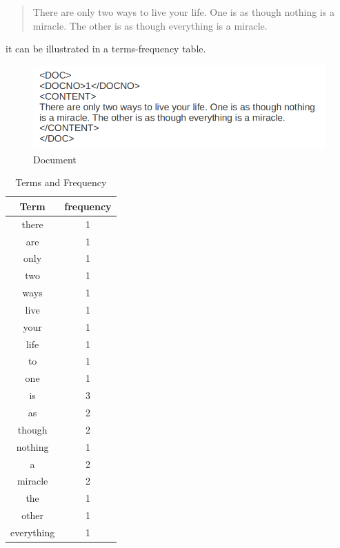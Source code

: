 \begin{quotation}
 \item There are only two ways to live your life. One is as though nothing is a miracle. The other is as though everything is a miracle.
\end{quotation}

it can be illustrated in a terms-frequency table.
\begin{figure}
\centering
\includegraphics[scale=0.5]{./figures/text.png}
\caption{Document} \label{fig:quote} 
\end{figure}

% 
\begin{table}
\centering
\begin{tabular}{|c|c|}

\hline \textbf{Term} & \textbf{frequency} \\
\hline there & 1 \\
\hline are & 1 \\
\hline only & 1 \\ 
\hline two & 1 \\
\hline ways & 1 \\
\hline live & 1 \\
\hline your & 1 \\
\hline life & 1 \\
\hline to & 1 \\
\hline one & 1 \\
\hline is & 3 \\
\hline as & 2 \\
\hline though & 2 \\
\hline nothing & 1 \\
\hline a & 2 \\
\hline miracle & 2 \\
\hline the & 1 \\
\hline other & 1 \\
\hline everything & 1 \\  
\hline
\end{tabular}
\caption{Terms and Frequency} \label{table:termsandfrequency}
\end{table}

